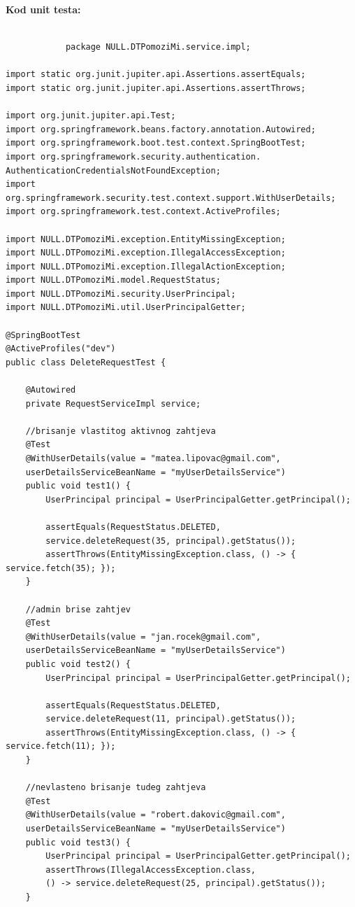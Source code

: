             \noindent \textbf{Kod unit testa: }
            \begin{verbatim}
            
            package NULL.DTPomoziMi.service.impl;

import static org.junit.jupiter.api.Assertions.assertEquals;
import static org.junit.jupiter.api.Assertions.assertThrows;

import org.junit.jupiter.api.Test;
import org.springframework.beans.factory.annotation.Autowired;
import org.springframework.boot.test.context.SpringBootTest;
import org.springframework.security.authentication.
AuthenticationCredentialsNotFoundException;
import org.springframework.security.test.context.support.WithUserDetails;
import org.springframework.test.context.ActiveProfiles;

import NULL.DTPomoziMi.exception.EntityMissingException;
import NULL.DTPomoziMi.exception.IllegalAccessException;
import NULL.DTPomoziMi.exception.IllegalActionException;
import NULL.DTPomoziMi.model.RequestStatus;
import NULL.DTPomoziMi.security.UserPrincipal;
import NULL.DTPomoziMi.util.UserPrincipalGetter;

@SpringBootTest
@ActiveProfiles("dev")
public class DeleteRequestTest {

	@Autowired
	private RequestServiceImpl service;

	//brisanje vlastitog aktivnog zahtjeva
	@Test
	@WithUserDetails(value = "matea.lipovac@gmail.com",
	userDetailsServiceBeanName = "myUserDetailsService")
	public void test1() {
		UserPrincipal principal = UserPrincipalGetter.getPrincipal();

		assertEquals(RequestStatus.DELETED,
		service.deleteRequest(35, principal).getStatus());
		assertThrows(EntityMissingException.class, () -> { service.fetch(35); });
	}

	//admin brise zahtjev
	@Test
	@WithUserDetails(value = "jan.rocek@gmail.com",
	userDetailsServiceBeanName = "myUserDetailsService")
	public void test2() {
		UserPrincipal principal = UserPrincipalGetter.getPrincipal();

		assertEquals(RequestStatus.DELETED,
		service.deleteRequest(11, principal).getStatus());
		assertThrows(EntityMissingException.class, () -> { service.fetch(11); });
	}

	//nevlasteno brisanje tudeg zahtjeva
	@Test
	@WithUserDetails(value = "robert.dakovic@gmail.com",
	userDetailsServiceBeanName = "myUserDetailsService")
	public void test3() {
		UserPrincipal principal = UserPrincipalGetter.getPrincipal();
		assertThrows(IllegalAccessException.class,
		() -> service.deleteRequest(25, principal).getStatus());
	}


\end{verbatim}
